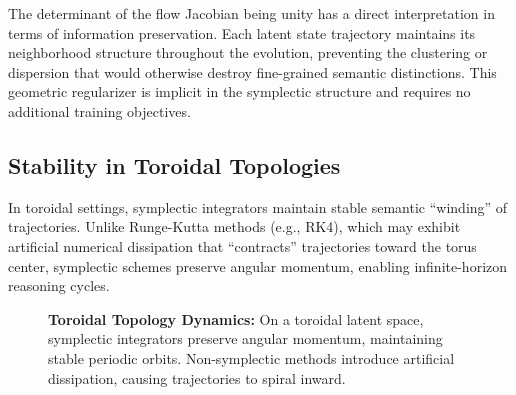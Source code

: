 \documentclass[12pt,a4paper]{article}
\begin{document}
The determinant of the flow Jacobian being unity has a direct interpretation in terms of information preservation. Each latent state trajectory maintains its neighborhood structure throughout the evolution, preventing the clustering or dispersion that would otherwise destroy fine-grained semantic distinctions. This geometric regularizer is implicit in the symplectic structure and requires no additional training objectives.

\subsection{Stability in Toroidal Topologies}

In toroidal settings, symplectic integrators maintain stable semantic ``winding'' of trajectories. Unlike Runge-Kutta methods (e.g., RK4), which may exhibit artificial numerical dissipation that ``contracts'' trajectories toward the torus center, symplectic schemes preserve angular momentum, enabling infinite-horizon reasoning cycles.

\begin{figure}[htbp]
\centering
{}
\caption{\textbf{Toroidal Topology Dynamics:} On a toroidal latent space, 
         symplectic integrators preserve angular momentum, maintaining 
         stable periodic orbits. Non-symplectic methods introduce 
         artificial dissipation, causing trajectories to spiral inward.}
\label{fig:torus_dynamics}
\end{figure}
\end{document}
